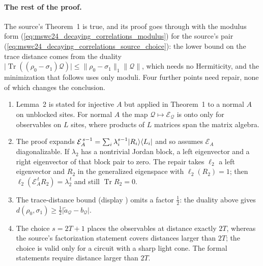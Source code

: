\documentclass{article}
\begin{document}
\paragraph{The rest of the proof.}
The source's Theorem~1 is true, and its proof goes through with the modulus
form (\ref{eq:mswc24_decaying_correlations_modulus}) for the source's
pair (\ref{eq:mswc24_decaying_correlations_source_choice}): the lower bound
on the trace distance comes from the duality
$\lvert\operatorname{Tr}((\rho_0-\sigma_1)\mathcal Q)\rvert
    \le\lVert\rho_0-\sigma_1\rVert_1\lVert\mathcal Q\rVert$, which needs no
Hermiticity, and the minimization that follows uses only moduli. Four further
points need repair, none of which changes the conclusion.
\begin{enumerate}
    \item Lemma~2 is stated for injective $A$ but applied in Theorem~1 to a
          normal $A$ on unblocked sites. For normal $A$ the map
          $\mathcal Q\mapsto\mathcal E_{\mathcal Q}$ is onto only for
          observables on $L$ sites, where products of $L$ matrices span the
          matrix algebra.
    \item The proof expands
          $\mathcal E_A^{\,s-1}=\sum_i\lambda_i^{s-1}|R_i\rangle\langle L_i|$ and
          so assumes $\mathcal E_A$ diagonalizable. If $\lambda_2$ has a
          nontrivial Jordan block, a left eigenvector and a right eigenvector
          of that block pair to zero.
          The repair takes $\ell_2$ a left eigenvector and $R_2$ in the
          generalized eigenspace with $\ell_2(R_2)=1$; then
          $\ell_2(\mathcal E_A^{\,t}R_2)=\lambda_2^{\,t}$ and still
          $\operatorname{Tr}R_2=0$.
    \item The trace-distance bound (display ) omits a factor
          $\tfrac12$: the duality above gives
          $d(\rho_0,\sigma_1)\ge\tfrac12\lvert\widetilde a_{\mathcal Q}
              -b_{\mathcal Q}\rvert$.
    \item The choice $s=2T+1$ places the observables at distance exactly
          $2T$, whereas the source's factorization statement covers distances
          larger than $2T$; the choice is valid only for a circuit with a
          sharp light cone. The formal statements require distance larger
          than $2T$.
\end{enumerate}
\end{document}
